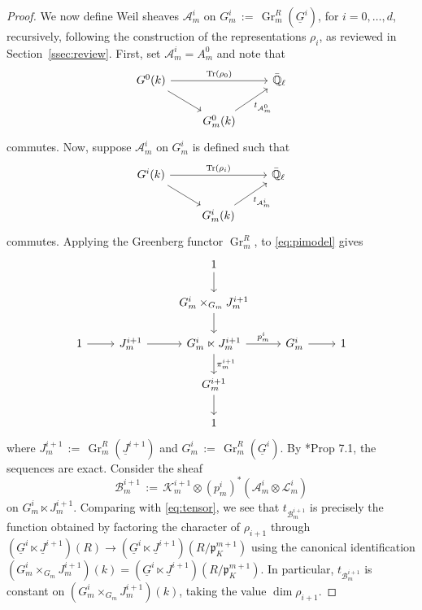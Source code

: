 \documentclass[10pt]{amsart}
\theoremstyle{plain}
\theoremstyle{definition}
\newcommand{\EE}{\mathbb{\bar Q}_\ell}
\newcommand{\Fq}{k}
\DeclareMathOperator{\Gr}{Gr}
\DeclareMathOperator{\trace}{Tr}
\newcommand{\ceq}{{\, :=\, }}
\newcommand{\trFrob}[1]{t_{#1}}
\newcommand{\cs}[1]{{\mathcal{#1}}}
\begin{document}
\begin{proof}
We now define Weil sheaves $\cs{A}^i_m$ on $G_m^i \ceq \Gr^{R}_m(\underline{G}^{i})$, for $i=0,\ldots ,d$, recursively, following the construction of the representations $\rho_i$, as reviewed in Section~\ref{ssec:review}.
First, set $\cs{A}_m^i = A_m^0$ and note that 
\[
\begin{tikzcd}
G^0(\Fq) \arrow{rr}{\trace(\rho_0)} \arrow{rd} && \EE\\
& G^0_m(\Fq) \arrow{ru}[swap]{\trFrob{\cs{A}_m^0}} & 
\end{tikzcd}
\]
commutes.
Now, suppose $\cs{A}^i_m$ on $G_m^i$ is defined such that
\[
\begin{tikzcd}
G^i(\Fq) \arrow{rr}{\trace(\rho_i)} \arrow{rd} && \EE\\
& G_m^i(\Fq) \arrow{ru}[swap]{\trFrob{\cs{A}_m^i}} & 
\end{tikzcd}
\]
commutes.
Applying the Greenberg functor $\Gr^{R}_m$, to \eqref{eq:pimodel} gives
\begin{equation}\label{eq:pi}
\begin{tikzcd}
\ && 1 \arrow{d} && \\
\ && G_m^{i}\times_{G_m} J_m^{i+1} \arrow{d} && \\
1 \arrow{r} &J_m^{i+1} \arrow{r} & G_m^i \ltimes J_m^{i+1} \arrow{d}{\pi_m^{i+1}} \arrow{r}{p_m^{i}} & G_m^i \arrow{r} & 1\\
&& G_m^{i+1} \arrow{d} && \\
&& 1 && 
\end{tikzcd}
\end{equation}
where $J_m^{i+1} \ceq \Gr^{R}_m(\underline{J}^{i+1})$ and $G_m^{i} \ceq \Gr^{R}_m(\underline{G}^{i})$.
By \cite{bertapelle-gonzales:Greenberg}*{Prop 7.1}, the sequences are exact.
Consider the sheaf 
\[
\cs{B}_m^{i+1} \ceq \cs{K}_m^{i+1} \otimes (p_m^{i})^*(\cs{A}_m^{i}\otimes \cs{L}_m^{i})
\]
on $G_m^{i}\ltimes J_m^{i+1}$.
Comparing with \eqref{eq:tensor}, we see that $\trFrob{\cs{B}_m^{i+1}}$ is precisely the function obtained by factoring the character of $\rho_{i+1}$ through $(\underline{G}^{i}\ltimes \underline{J}^{i+1})(R) \to (\underline{G}^{i}\ltimes \underline{J}^{i+1})(R/\mathfrak{p}_K^{m+1})$ using the canonical identification $(G_m^{i}\times_{G_m} J_m^{i+1})(\Fq) =  (\underline{G}^{i}\ltimes \underline{J}^{i+1})(R/\mathfrak{p}_K^{m+1})$. 
In particular, $\trFrob{\cs{B}^{i+1}_m}$ is constant on $(G_m^{i}\times_{G_m} J_m^{i+1})(\Fq)$, taking the value $\dim \rho_{i+1}$.

\end{proof}
\end{document}
